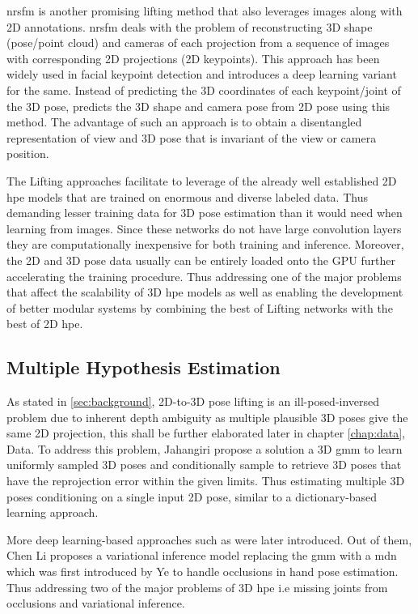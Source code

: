 \ac{nrsfm} is another promising lifting method that also leverages images along with 2D annotations. \ac{nrsfm} deals with the problem of reconstructing 3D shape (pose/point cloud) and cameras of each projection from a sequence of images with corresponding 2D projections (2D keypoints). This approach has been widely used in facial keypoint detection and \cite{deepNRSFM} introduces a deep learning variant for the same. Instead of predicting the 3D coordinates of each keypoint/joint of the 3D pose, \cite{DistillNRSfM, c3dpo, deepNRSFM, nrsfm++} predicts the 3D shape and camera pose from 2D pose using this method. The advantage of such an approach is to obtain a disentangled representation of view and 3D pose that is invariant of the view or camera position.

The Lifting approaches facilitate to leverage of the already well established 2D \ac{hpe} models that are trained on enormous and diverse labeled data. Thus demanding lesser training data for 3D pose estimation than it would need when learning from images. Since these networks do not have large convolution layers they are computationally inexpensive for both training and inference. Moreover, the 2D and 3D pose data usually can be entirely loaded onto the GPU further accelerating the training procedure. Thus addressing one of the major problems that affect the scalability of 3D \ac{hpe} models as well as enabling the development of better modular systems by combining the best of Lifting networks with the best of 2D \ac{hpe}.

\subsection{Multiple Hypothesis Estimation}
\label{subsec:multiple_hypothesis_estimation}

As stated in \ref{sec:background}, 2D-to-3D pose lifting is an ill-posed-inversed problem due to inherent depth ambiguity as multiple plausible 3D poses give the same 2D projection, this shall be further elaborated later in chapter \ref{chap:data}, Data. To address this problem, Jahangiri \etal \cite{jahangiri} propose a solution a 3D \ac{gmm} to learn uniformly sampled 3D poses and conditionally sample to retrieve 3D poses that have the reprojection error within the given limits. Thus estimating multiple 3D poses conditioning on a single input 2D pose, similar to a dictionary-based learning approach. 

More deep learning-based approaches such as \cite{weaklymultiple,multiplehypo,ordinalranking} were later introduced. Out of them, Chen Li \etal \cite{multiplehypo} proposes a variational inference model replacing the \ac{gmm} with a \ac{mdn} which was first introduced by Ye \etal \cite{mixturedensitymodel} to handle occlusions in hand pose estimation. Thus addressing two of the major problems of 3D \ac{hpe} i.e missing joints from occlusions and variational inference. 


